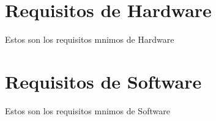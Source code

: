 \section{Requisitos de Hardware}
Estos son los requisitos mnimos de Hardware
\section{Requisitos de Software}
Estos son los requisitos mnimos de Software